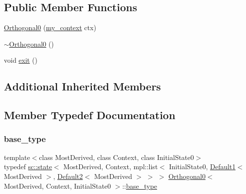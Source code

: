 \subsection*{Public Member Functions}
\begin{DoxyCompactItemize}
\item 
\mbox{\hyperlink{struct_orthogonal0_a8e9c10e226edd941dba2ecb670ecb7b9}{Orthogonal0}} (\mbox{\hyperlink{struct_orthogonal0_a9e83fb13d36d05273364de4b3101f135}{my\+\_\+context}} ctx)
\item 
\mbox{\hyperlink{struct_orthogonal0_aab4e3aba86830abb33ffe13a41ef6740}{$\sim$\+Orthogonal0}} ()
\item 
void \mbox{\hyperlink{struct_orthogonal0_a3aaddfeb2c0fd79d819663cf36d257c6}{exit}} ()
\end{DoxyCompactItemize}
\subsection*{Additional Inherited Members}


\subsection{Member Typedef Documentation}
\mbox{\label{struct_orthogonal0_a135d1336c31ba010c0fb4278929a5ee4}} 
\subsubsection{\texorpdfstring{base\+\_\+type}{base\_type}}
{\footnotesize\ttfamily template$<$class Most\+Derived, class Context, class Initial\+State0$>$ \\
typedef \mbox{\hyperlink{classboost_1_1statechart_1_1state}{sc\+::state}}$<$ Most\+Derived, Context, mpl\+::list$<$ Initial\+State0, \mbox{\hyperlink{struct_default1}{Default1}}$<$ Most\+Derived $>$, \mbox{\hyperlink{struct_default2}{Default2}}$<$ Most\+Derived $>$ $>$ $>$ \mbox{\hyperlink{struct_orthogonal0}{Orthogonal0}}$<$ Most\+Derived, Context, Initial\+State0 $>$\+::\mbox{\hyperlink{struct_orthogonal0_a135d1336c31ba010c0fb4278929a5ee4}{base\+\_\+type}}}

\mbox{\label{struct_orthogonal0_abb626b2be8b94179a3b2404893065960}} 
